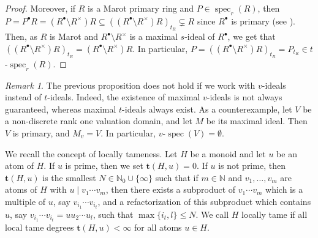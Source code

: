 \documentclass[a4paper, 10pt]{amsart}
\newcommand{\defit}[1]{{\textsf{#1}}}
\theoremstyle{plain}
\theoremstyle{definition}
\theoremstyle{remark}
\newtheorem{remark}[theorem]{Remark}
\DeclareMathOperator{\spec}{spec}
\numberwithin{equation}{section}
\begin{document}
\begin{proof}
     Moreover, if $R$ is a Marot primary ring and $P\in \spec_r(R)$, then $P=P^\bullet R=(R^\bullet\setminus R^\times)R\subseteq ((R^\bullet\setminus R^\times)R)_{t_R}\subsetneq R$
     since $R^\bullet$ is primary (see \cite[Theorem 2.7]{CO22}). 
     Then, as $R$ is Marot and $R^{\bullet} \setminus R^{\times}$ is a maximal  $s$-ideal of $R^{\bullet}$, we get that $((R^{\bullet} \setminus R^{\times})R)_{t_R}= (R^{\bullet} \setminus R^{\times})R$. In particular,
      $P=((R^\bullet\setminus R^\times)R)_{t_R}=P_{t_R}\in t$-$\spec_r(R).$
\end{proof}

\begin{remark}\label{rmk: falseprop}
    The previous proposition does not hold if we work with $v$-ideals instead of $t$-ideals. Indeed, the existence of maximal $v$-ideals is not always guaranteed, whereas maximal 
$t$-ideals always exist. As a counterexample, let $V$ be a non-discrete rank one valuation domain, and let $M$ be its maximal ideal. Then $V$ is primary, and $M_v=V$. In particular, $v$-$\spec(V)=\emptyset$.
\end{remark}
We recall the concept of locally tameness. Let $H$ be a monoid and let $u$ be an atom of $H$. If $u$ is prime, then we set $\mathbf{t}(H,u)=0.$ If $u$ is not prime, then $\mathbf{t}(H,u)$ is the smallest $N\in \mathbb N_0\cup \{\infty\}$ such that if $m\in \mathbb N$ and $v_1,\ldots, v_m$  are atoms of $H$ with $u\mid v_1\cdots v_m$, then there exists a subproduct of $v_1\cdots v_m$ which is a multiple of $u$, say $v_{i_1}\cdots v_{i_t}$, and a refactorization of this subproduct which contains $u$, say $v_{i_1}\cdots v_{i_t}=uu_2\cdots u_l$, such that $\max\{i_t,l\}\le N.$ We call $H$ \defit{locally tame} if all local tame degrees $\mathbf{t}(H,u)<\infty$ for all atoms $u\in H.$
\end{document}
